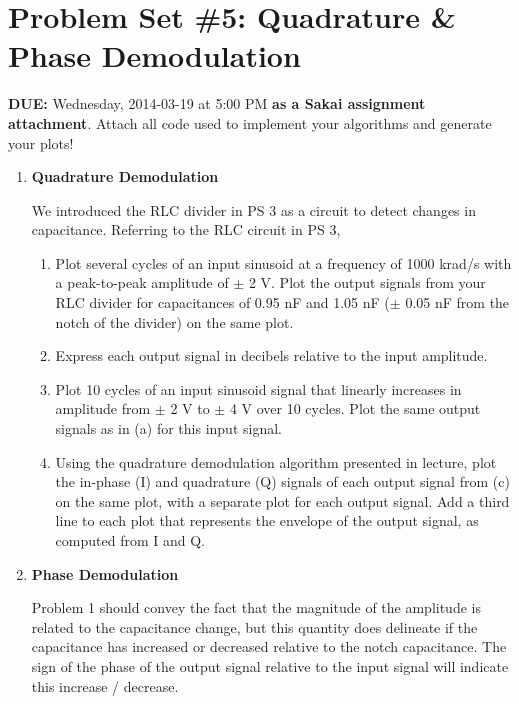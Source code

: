 


\section*{Problem Set \#5: Quadrature \& Phase Demodulation}

\textbf{DUE:} Wednesday, 2014-03-19 at 5:00 PM \textbf{as a Sakai assignment
    attachment}.  Attach all code used to implement your algorithms and
    generate your plots!

\begin{enumerate}

\item \textbf{Quadrature Demodulation}

    We introduced the RLC divider in PS 3 as a circuit to detect changes in capacitance.  Referring to the RLC circuit in PS 3,

    \begin{enumerate}
        \item Plot several cycles of an input sinusoid at a frequency of 1000
            krad/s with a peak-to-peak amplitude of $\pm$ 2 V.  Plot the output
            signals from your RLC divider for capacitances of 0.95 nF and 1.05
            nF ($\pm$ 0.05 nF from the notch of the divider) on the same plot.

        \item Express each output signal in decibels relative to the input
            amplitude.

        \item Plot 10 cycles of an input sinusoid signal that linearly
            increases in amplitude from $\pm$ 2 V to $\pm$ 4 V over 10 cycles.  
            Plot the same output signals as in (a) for this input signal.

        \item Using the quadrature demodulation algorithm presented in lecture,
            plot the in-phase (I) and quadrature (Q) signals of each output
            signal from (c) on the same plot, with a separate plot for each
            output signal.  Add a third line to each plot that represents the
            envelope of the output signal, as computed from I and Q.

    \end{enumerate}

\item \textbf{Phase Demodulation}

    Problem 1 should convey the fact that the magnitude of the amplitude is
    related to the capacitance change, but this quantity does delineate if the
    capacitance has increased or decreased relative to the notch capacitance.
    The sign of the phase of the output signal relative to the input signal
    will indicate this increase / decrease.


\end{enumerate}
